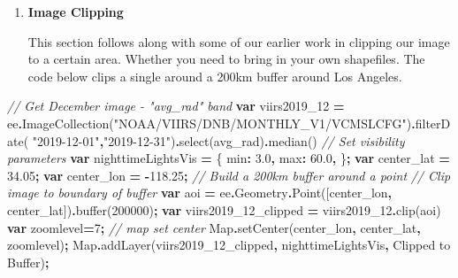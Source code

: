 \documentclass[
]{article}
\newenvironment{Shaded}{\begin{snugshade}}{\end{snugshade}}
\newcommand{\AttributeTok}[1]{\textcolor[rgb]{0.77,0.63,0.00}{#1}}
\newcommand{\BuiltInTok}[1]{#1}
\newcommand{\CommentTok}[1]{\textcolor[rgb]{0.56,0.35,0.01}{\textit{#1}}}
\newcommand{\DataTypeTok}[1]{\textcolor[rgb]{0.13,0.29,0.53}{#1}}
\newcommand{\DecValTok}[1]{\textcolor[rgb]{0.00,0.00,0.81}{#1}}
\newcommand{\FloatTok}[1]{\textcolor[rgb]{0.00,0.00,0.81}{#1}}
\newcommand{\FunctionTok}[1]{\textcolor[rgb]{0.00,0.00,0.00}{#1}}
\newcommand{\KeywordTok}[1]{\textcolor[rgb]{0.13,0.29,0.53}{\textbf{#1}}}
\newcommand{\NormalTok}[1]{#1}
\newcommand{\OperatorTok}[1]{\textcolor[rgb]{0.81,0.36,0.00}{\textbf{#1}}}
\newcommand{\StringTok}[1]{\textcolor[rgb]{0.31,0.60,0.02}{#1}}
\begin{document}
\begin{enumerate}
\def\labelenumi{\arabic{enumi}.}
\setcounter{enumi}{1}
\item
  \textbf{Image Clipping}

  This section follows along with some of our earlier work in clipping our image to a certain area. Whether you need to bring in your own shapefiles. The code below clips a single around a 200km buffer around Los Angeles.
\end{enumerate}

\begin{Shaded}
\begin{Highlighting}[]
\CommentTok{// Get December image {-} "avg\_rad" band}
\KeywordTok{var}\NormalTok{ viirs2019\_12 }\OperatorTok{=}\NormalTok{ ee}\OperatorTok{.}\FunctionTok{ImageCollection}\NormalTok{(}\StringTok{"NOAA/VIIRS/DNB/MONTHLY\_V1/VCMSLCFG"}\NormalTok{)}\OperatorTok{.}\FunctionTok{filterDate}\NormalTok{(}
  \StringTok{"2019{-}12{-}01"}\OperatorTok{,}\StringTok{"2019{-}12{-}31"}\NormalTok{)}\OperatorTok{.}\FunctionTok{select}\NormalTok{(}\StringTok{\textquotesingle{}avg\_rad\textquotesingle{}}\NormalTok{)}\OperatorTok{.}\FunctionTok{median}\NormalTok{()}
\CommentTok{// Set visibility parameters}
\KeywordTok{var}\NormalTok{ nighttimeLightsVis }\OperatorTok{=}\NormalTok{ \{}
  \DataTypeTok{min}\OperatorTok{:} \FloatTok{3.0}\OperatorTok{,}
  \DataTypeTok{max}\OperatorTok{:} \FloatTok{60.0}\OperatorTok{,}
\NormalTok{\}}\OperatorTok{;}
\KeywordTok{var}\NormalTok{ center\_lat }\OperatorTok{=} \FloatTok{34.05}\OperatorTok{;}
\KeywordTok{var}\NormalTok{ center\_lon }\OperatorTok{=} \OperatorTok{{-}}\FloatTok{118.25}\OperatorTok{;}
\CommentTok{// Build a 200km buffer around a point}
\CommentTok{// Clip image to boundary of buffer}
\KeywordTok{var}\NormalTok{ aoi }\OperatorTok{=}\NormalTok{ ee}\OperatorTok{.}\AttributeTok{Geometry}\OperatorTok{.}\FunctionTok{Point}\NormalTok{([center\_lon}\OperatorTok{,}\NormalTok{ center\_lat])}\OperatorTok{.}\FunctionTok{buffer}\NormalTok{(}\DecValTok{200000}\NormalTok{)}\OperatorTok{;}
\KeywordTok{var}\NormalTok{ viirs2019\_12\_clipped }\OperatorTok{=}\NormalTok{ viirs2019\_12}\OperatorTok{.}\FunctionTok{clip}\NormalTok{(aoi)}
\KeywordTok{var}\NormalTok{ zoomlevel}\OperatorTok{=}\DecValTok{7}\OperatorTok{;}
\CommentTok{// map set center }
\BuiltInTok{Map}\OperatorTok{.}\FunctionTok{setCenter}\NormalTok{(center\_lon}\OperatorTok{,}\NormalTok{ center\_lat}\OperatorTok{,}\NormalTok{ zoomlevel)}\OperatorTok{;}
\BuiltInTok{Map}\OperatorTok{.}\FunctionTok{addLayer}\NormalTok{(viirs2019\_12\_clipped}\OperatorTok{,}\NormalTok{ nighttimeLightsVis}\OperatorTok{,} \StringTok{\textquotesingle{}Clipped to Buffer\textquotesingle{}}\NormalTok{)}\OperatorTok{;}
\end{Highlighting}
\end{Shaded}
\end{document}
